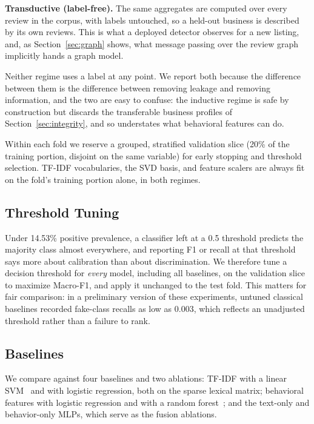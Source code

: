 \documentclass[conference]{IEEEtran}
\begin{document}
\textbf{Transductive (label-free).} The same aggregates are computed over every
review in the corpus, with labels untouched, so a held-out business is
described by its own reviews. This is what a deployed detector observes for a
new listing, and, as Section~\ref{sec:graph} shows, what message passing over
the review graph implicitly hands a graph model.

Neither regime uses a label at any point. We report both because the difference
between them is the difference between removing leakage and removing
information, and the two are easy to confuse: the inductive regime is safe by
construction but discards the transferable business profiles of
Section~\ref{sec:integrity}, and so understates what behavioral features can do.

Within each fold we reserve a grouped, stratified validation slice (20\% of the
training portion, disjoint on the same variable) for early stopping and
threshold selection. TF-IDF vocabularies, the SVD basis, and feature scalers are
always fit on the fold's training portion alone, in both regimes.

\subsection{Threshold Tuning}

Under 14.53\% positive prevalence, a classifier left at a 0.5 threshold predicts
the majority class almost everywhere, and reporting F1 or recall at that
threshold says more about calibration than about discrimination. We therefore
tune a decision threshold for \textit{every} model, including all baselines, on
the validation slice to maximize Macro-F1, and apply it unchanged to the test
fold. This matters for fair comparison: in a preliminary version of these
experiments, untuned classical baselines recorded fake-class recalls as low as
0.003, which reflects an unadjusted threshold rather than a failure to rank.

\subsection{Baselines}

We compare against four baselines and two ablations: TF-IDF with a linear
SVM~\cite{cortes1995support} and with logistic regression, both on the sparse
lexical matrix; behavioral features with logistic regression and with a random
forest~\cite{breiman2001random}; and the text-only and behavior-only MLPs, which
serve as the fusion ablations.
\end{document}
